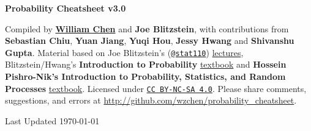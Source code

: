 \documentclass[10pt,landscape]{article}
\begin{document}
    \raggedright
    \footnotesize
    \begin{multicols*}{3}

        \setlength{\premulticols}{1pt}
        \setlength{\postmulticols}{1pt}
        \setlength{\multicolsep}{1pt}
        \setlength{\columnsep}{2pt}


        \begin{center}
		{\color{blue} \Large{\textbf{Probability Cheatsheet v3.0}}} \\

        \end{center}


        \scriptsize

        Compiled by \href{http://wzchen.com}{\textbf{William Chen}} and \textbf{Joe Blitzstein}, with contributions from \textbf{Sebastian Chiu}, \textbf{Yuan Jiang}, \textbf{Yuqi Hou}, \textbf{Jessy Hwang} and \textbf{Shivanshu Gupta}. Material based on Joe Blitzstein's (\texttt{\href{http://twitter.com/stat110}{@stat110}}) \href{http://stat110.net}{lectures}, Blitzstein/Hwang's \textbf{Introduction to Probability} \href{http://bit.ly/introprobability}{textbook} and \textbf{Hossein Pishro-Nik's Introduction to Probability, Statistics, and Random Processes} \href{https://www.probabilitycourse.com/}{textbook}. Licensed under \texttt{\href{http://creativecommons.org/licenses/by-nc-sa/4.0/}{CC BY-NC-SA 4.0}}. Please share comments, suggestions, and errors at \url{http://github.com/wzchen/probability_cheatsheet}.

        \begin{center}
            Last Updated \today
        \end{center}





\end{multicols*}
\end{document}
